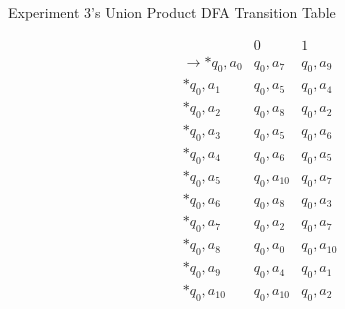 \documentclass[conference]{IEEEtran}
\begin{document}
\begin{table}[h!]
    \caption{Experiment 3's Union Product DFA Transition Table}
    \begin{displaymath}
        \begin{array}{r|c|c|}
        & 0 & 1 \\
        \hline
        \rightarrow * q_0,a_0 & q_0,a_7 & q_0,a_9 \\
        * q_0,a_1 & q_0,a_5 & q_0,a_4 \\
        * q_0,a_2 & q_0,a_8 & q_0,a_2 \\
        * q_0,a_3 & q_0,a_5 & q_0,a_6 \\
        * q_0,a_4 & q_0,a_6 & q_0,a_5 \\
        * q_0,a_5 & q_0,a_{10} & q_0,a_7 \\
        * q_0,a_6 & q_0,a_8 & q_0,a_3 \\
        * q_0,a_7 & q_0,a_2 & q_0,a_7 \\
        * q_0,a_8 & q_0,a_0 & q_0,a_{10} \\
        * q_0,a_9 & q_0,a_4 & q_0,a_1 \\
        * q_0,a_{10} & q_0,a_{10} & q_0,a_2 \\
        \end{array}
    \end{displaymath}
    \label{table-exp3-dfaprodu}
\end{table}
\end{document}
